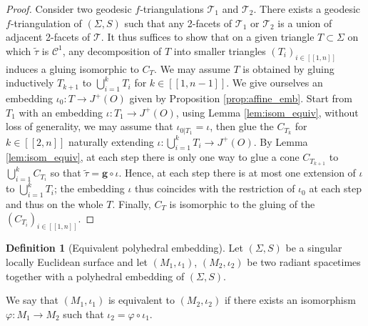 \documentclass[a4paper,12pt]{article}
\def\lsem{[\![}
\def\rsem{]\!]}
\def\TT{\mathcal T}
\def\quadform{\mathbf{g}}
\theoremstyle{definition}
\newtheorem{defi}[lem]{Definition}	%
\begin{document}
							\begin{proof}							 
							 Consider two geodesic $f$-triangulations $\TT_1$ and $\TT_2$. There exists a geodesic $f$-triangulation of $(\Sigma, S)$ such that any 2-facets of $\TT_1$ or  $\TT_2$ is a union of adjacent 2-facets of $\TT$. It thus suffices to show that 
							 on a given triangle $T\subset \Sigma$ on which $\widetilde\tau$ is $\mathscr C^1$, any decomposition of $T$ into smaller triangles $(T_i)_{i\in \lsem 1,n\rsem}$ induces a gluing isomorphic to $C_T$. We may assume $T$ is obtained by gluing inductively $T_{k+1}$ to $\bigcup_{i=1}^k T_i$ for $k\in \lsem 1,n-1\rsem$. We give ourselves an embedding $\iota_0: T \rightarrow J^+(O)$ given by Proposition \ref{prop:affine_emb}. Start from $T_{1}$ with an embedding $\iota:T_1\rightarrow J^+(O)$, using Lemma \ref{lem:isom_equiv}, without loss of generality, we may assume that $\iota_{0|T_1}=\iota$, then glue the $C_{T_k}$ for $k\in \lsem 2,n\rsem$ naturally extending $\iota:\bigcup_{i=1}^kT_i \rightarrow J^+(O)$. By Lemma \ref{lem:isom_equiv}, at each step there is only one way to glue a cone $C_{T_{k+1}}$ to $\bigcup_{i=1}^kC_{T_i}$ so that $\widetilde\tau = \quadform\circ \iota$. Hence, at each step there is at most one extension of $\iota$ to $\bigcup_{i=1}^kT_i$; the embedding $\iota$ thus coincides with the restriction of $\iota_0$ at each step and thus on the whole $T$. Finally, $C_T$ is isomorphic to the gluing of the $(C_{T_i})_{i\in\lsem 1,n\rsem}$.
							\end{proof}

					\begin{defi}[Equivalent polyhedral embedding]\label{def:equivalent_polyhedral_embedding} Let $(\Sigma, S)$ be a singular locally Euclidean surface and let $(M_1,\iota_1)$, $(M_2,\iota_2)$ be two radiant spacetimes together with a polyhedral embedding of $(\Sigma, S)$. 
					
					We say that $(M_1,\iota_1)$ is equivalent to $(M_2,\iota_2)$ if there exists an isomorphism $\varphi: M_1\rightarrow M_2$ such that $\iota_2 = \varphi \circ \iota_1$.
					 
					\end{defi}
					
\end{document}
